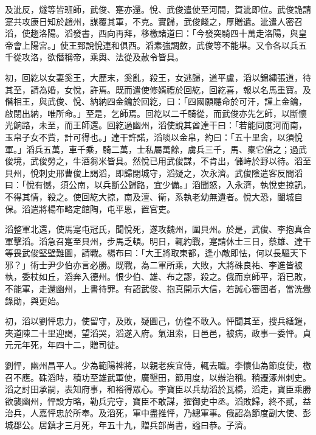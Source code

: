 \begin{pinyinscope}
 及泚反，燧等皆班師，武俊、寔亦還。悅、武俊遣使至河間，賀泚即位。武俊詭請寔共攻康日知於趙州，謀覆其軍，不克。實歸，武俊餞之，厚贈遺。泚遣人密召滔，使趨洛陽。滔發書，西向再拜，移檄諸道曰：「今發突騎四十萬走洛陽，與皇帝會上陽宮。」使王郅說悅連和俱西。滔素強調斂，武俊等不能堪。又令各以兵五千從攻洛，欲僭稱帝，乘輿、法從及赦令皆具。



 初，回紇以女妻奚王，大歷末，奚亂，殺王，女逃歸，道平盧，滔以錦繡張道，待其至，請為婚，女悅，許焉。既而遣使修婿禮於回紇，回紇喜，報以名馬重寶。及僭相王，與武俊、悅、納納四金鑰於回紇，曰：「四國願聽命於可汗，謹上金鑰，啟閉出納，唯所命。」至是，乞師焉。回紇以二千騎從，而武俊亦先乞師，以斷懷光餉路，未至，而王師還。回紇過幽州，滔使說其酋達干曰：「若能同度河而南，玉帛子女不貲，計可得也。」達干許諾，滔啖以金帛，約曰：「五十里舍，以須悅軍。」滔兵五萬，車千乘，騎二萬，士私屬萬餘，虜兵三千，馬、橐它倍之；過武俊境，武俊勞之，牛酒芻米皆具。然悅已用武俊謀，不肯出，儲峙於野以待。滔至貝州，悅刺史邢曹俊上謁滔，即歸閉城守，滔疑之，次永濟。武俊陰遣客反間滔曰：「悅有憾，須公南，以兵斷公歸路，宜少備。」滔聞怒，入永濟，執悅吏掠訊，不得其情，殺之。使回紇大掠，南及澶、衛，系執老幼無遺者。悅大恐，闔城自保。滔遣將楊布略定館陶，屯平恩，置官吏。



 滔整軍北還，使馬寔屯冠氏，聞悅死，遂攻魏州，圍貝州。於是，武俊、李抱真合軍擊滔。滔急召寔至貝州，步馬乏頓。明日，輒約戰，寔請休士三日，蔡雄、達干等畏武俊堅壁難圖，請戰。楊布曰：「大王將取東都，逢小敵即怯，何以長驅天下邪？」術士尹少伯亦言必勝。既戰，為二軍所乘，大敗，大將硃良祐、李進皆被執，委杖如丘，滔奔入德州。恨少伯、雄、布之謬，殺之。俄而京師平，滔已敗，不能軍，走還幽州，上書待罪。有詔武俊、抱真開示大信，若誠心審固者，當洗釁錄勛，與更始。



 初，滔以劉怦忠力，使留守，及敗，疑圖己，仿徨不敢入。怦聞其至，搜兵繕鎧，夾道陳二十里迎謁，望滔哭，滔遂入府。氣沮索，日邑邑，被病，政事一委怦。貞元元年死，年四十二，贈司徒。



 劉怦，幽州昌平人。少為範陽裨將，以親老疾宜侍，輒去職。李懷仙為節度使，檄召不應。硃滔時，積功至雄武軍使，廣墾田，節用度，以辦治稱。稍遷涿州刺史。滔之討田承嗣，表知府事，和裕得眾心。李寶臣以兵劫滔於瓦橋，滔走，寶臣乘勝欲襲幽州，怦設方略，勒兵完守，寶臣不敢謀，擢御史中丞。滔敗歸，終不貳，益治兵，人嘉怦忠於所奉。及滔死，軍中盡推怦，乃總軍事。俄詔為節度副大使、彭城郡公。居鎮才三月死，年五十九，贈兵部尚書，謚曰恭。子濟。




\end{pinyinscope}
